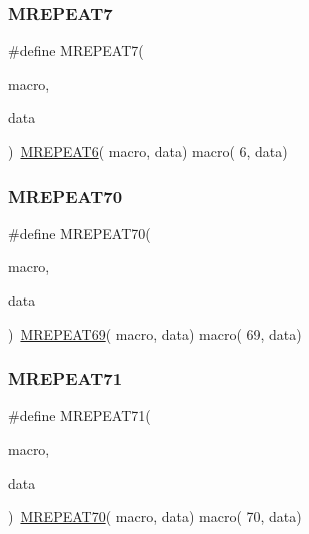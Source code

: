 \mbox{\label{group__group__sam0__utils__mrepeat_ga62b2ea428fd7ac3b52107ef1e4ec984c}} 
\subsubsection{\texorpdfstring{MREPEAT7}{MREPEAT7}}
{\footnotesize\ttfamily \#define M\+R\+E\+P\+E\+A\+T7(\begin{DoxyParamCaption}\item[{}]{macro,  }\item[{}]{data }\end{DoxyParamCaption})~\mbox{\hyperlink{group__group__sam0__utils__mrepeat_ga1c868616b8ea237923942783244f4512}{M\+R\+E\+P\+E\+A\+T6}}(  macro, data)   macro(  6, data)}

\mbox{\label{group__group__sam0__utils__mrepeat_ga677da95097e98df0ab8d600dc490e39a}} 
\subsubsection{\texorpdfstring{MREPEAT70}{MREPEAT70}}
{\footnotesize\ttfamily \#define M\+R\+E\+P\+E\+A\+T70(\begin{DoxyParamCaption}\item[{}]{macro,  }\item[{}]{data }\end{DoxyParamCaption})~\mbox{\hyperlink{group__group__sam0__utils__mrepeat_gaf5b5c7b140c272560551ca6b6b37256c}{M\+R\+E\+P\+E\+A\+T69}}( macro, data)   macro( 69, data)}

\mbox{\label{group__group__sam0__utils__mrepeat_ga702fd0113374ea1ce97cbc50be2332f9}} 
\subsubsection{\texorpdfstring{MREPEAT71}{MREPEAT71}}
{\footnotesize\ttfamily \#define M\+R\+E\+P\+E\+A\+T71(\begin{DoxyParamCaption}\item[{}]{macro,  }\item[{}]{data }\end{DoxyParamCaption})~\mbox{\hyperlink{group__group__sam0__utils__mrepeat_ga677da95097e98df0ab8d600dc490e39a}{M\+R\+E\+P\+E\+A\+T70}}( macro, data)   macro( 70, data)}

